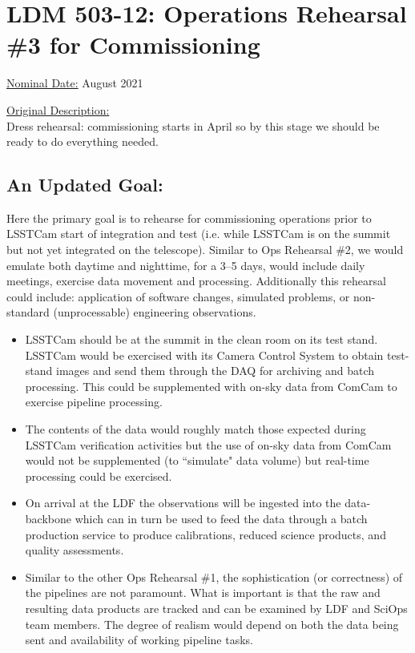 
\section{LDM 503-12: Operations Rehearsal \#3 for Commissioning}

\underline{Nominal Date:} August 2021

\underline{Original Description:}\\
Dress rehearsal: commissioning starts in April so by this stage we should 
be ready to do everything needed.

\subsection{An Updated Goal:}

Here the primary goal is to rehearse for commissioning operations prior to 
LSSTCam start of integration and test (i.e. while LSSTCam is on the summit
but not yet integrated on the telescope).  Similar to Ops Rehearsal \#2, 
we would emulate both daytime and nighttime, 
for a 3--5 days, would include daily meetings, exercise data movement and
processing.  Additionally this rehearsal could include: application of software 
changes, simulated problems, or non-standard (unprocessable) engineering 
observations.  

\begin{itemize}[topsep=-8pt]
\item LSSTCam should be at the summit in the clean room on its test stand.
LSSTCam would be exercised with its Camera Control System to obtain test-stand
images and send them through the DAQ for archiving and batch processing.  This
could be supplemented with on-sky data from ComCam to exercise pipeline 
processing.

\item The contents of the data would roughly match those expected during 
LSSTCam verification activities but the use of on-sky data from ComCam would
not be supplemented (to ``simulate" data volume) but real-time processing
could be exercised.

\item On arrival at the LDF the observations will be ingested into the 
data-backbone which can in turn be used to feed the data through a batch
production service to produce calibrations, reduced science products, and
quality assessments.

\item Similar to the other Ops Rehearsal \#1, the sophistication (or correctness)
of the pipelines are not paramount.  What is important is that the raw and
resulting data products are tracked and can be examined by LDF and
SciOps team members.  The degree of realism would depend on both the data
being sent and availability of working pipeline tasks.
\end{itemize}

\clearpage


